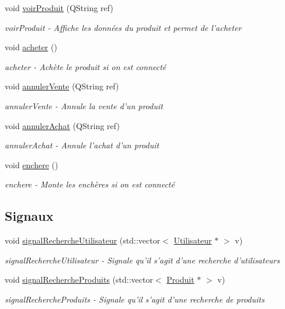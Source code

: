 \begin{DoxyCompactItemize}
void \hyperlink{class_ma_fenetre_ade3a46e2b308936d934503a88275495a}{voir\-Produit} (Q\-String ref)
\begin{DoxyCompactList}\small\item\em voir\-Produit -\/ Affiche les données du produit et permet de l'acheter \end{DoxyCompactList}\item 
void \hyperlink{class_ma_fenetre_a44eae809341ad4816d8ca151d9b703fb}{acheter} ()
\begin{DoxyCompactList}\small\item\em acheter -\/ Achète le produit si on est connecté \end{DoxyCompactList}\item 
void \hyperlink{class_ma_fenetre_a54a08a443ed9569c05034ff26e0423a8}{annuler\-Vente} (Q\-String ref)
\begin{DoxyCompactList}\small\item\em annuler\-Vente -\/ Annule la vente d'un produit \end{DoxyCompactList}\item 
void \hyperlink{class_ma_fenetre_a3f25f39dab59154d77a9eab872339cfc}{annuler\-Achat} (Q\-String ref)
\begin{DoxyCompactList}\small\item\em annuler\-Achat -\/ Annule l'achat d'un produit \end{DoxyCompactList}\item 
void \hyperlink{class_ma_fenetre_a2e2e3b2de1a889269495ccc8b6f8a1fd}{enchere} ()
\begin{DoxyCompactList}\small\item\em enchere -\/ Monte les enchères si on est connecté \end{DoxyCompactList}\end{DoxyCompactItemize}
\subsection*{Signaux}
\begin{DoxyCompactItemize}
\item 
void \hyperlink{class_ma_fenetre_aed4dd546bfb6e374aa317946e9247d4f}{signal\-Recherche\-Utilisateur} (std\-::vector$<$ \hyperlink{class_utilisateur}{Utilisateur} $\ast$ $>$ v)
\begin{DoxyCompactList}\small\item\em signal\-Recherche\-Utilisateur -\/ Signale qu'il s'agit d'une recherche d'utilisateurs \end{DoxyCompactList}\item 
void \hyperlink{class_ma_fenetre_a75cd895beb38fe68a4319eb6c37ac8ee}{signal\-Recherche\-Produits} (std\-::vector$<$ \hyperlink{class_produit}{Produit} $\ast$ $>$ v)
\begin{DoxyCompactList}\small\item\em signal\-Recherche\-Produits -\/ Signale qu'il s'agit d'une recherche de produits \end{DoxyCompactList}\end{DoxyCompactItemize}
